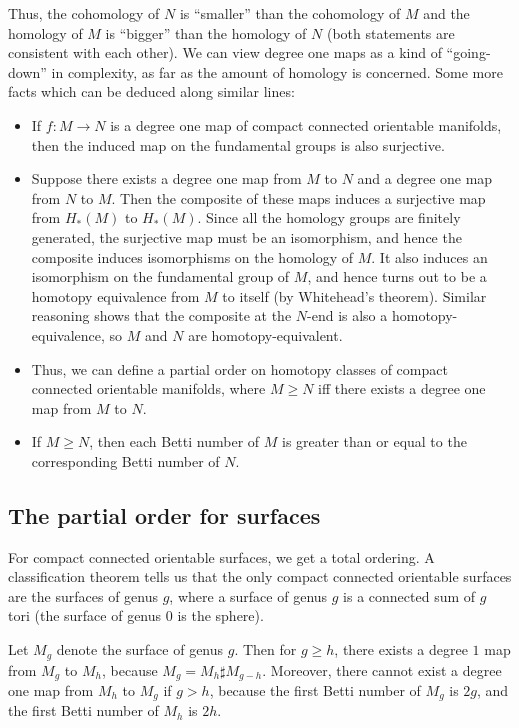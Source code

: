 \documentclass[a4paper]{amsart}
\begin{document}
Thus, the cohomology of $N$ is ``smaller'' than the cohomology of $M$
and the homology of $M$ is ``bigger'' than the homology of $N$ (both
statements are consistent with each other). We can view degree one
maps as a kind of ``going-down'' in complexity, as far as the amount
of homology is concerned. Some more facts which can be deduced along
similar lines:

\begin{itemize}

\item If $f:M \to N$ is a degree one map of compact connected
  orientable manifolds, then the induced map on the fundamental groups
  is also surjective.

\item Suppose there exists a degree one map from $M$ to $N$ and a
  degree one map from $N$ to $M$. Then the composite of these maps
  induces a surjective map from $H_*(M)$ to $H_*(M)$. Since all the
  homology groups are finitely generated, the surjective map must be
  an isomorphism, and hence the composite induces isomorphisms on the
  homology of $M$. It also induces an isomorphism on the fundamental
  group of $M$, and hence turns out to be a homotopy equivalence from
  $M$ to itself (by Whitehead's theorem). Similar reasoning shows that
  the composite at the $N$-end is also a homotopy-equivalence, so $M$
  and $N$ are homotopy-equivalent.

\item Thus, we can define a partial order on homotopy classes of
  compact connected orientable manifolds, where $M \ge N$ iff there
  exists a degree one map from $M$ to $N$.

\item If $M \ge N$, then each Betti number of $M$ is greater than or
  equal to the corresponding Betti number of $N$.
\end{itemize}

\subsection{The partial order for surfaces}

For compact connected orientable surfaces, we get a total ordering. A
classification theorem tells us that the only compact connected
orientable surfaces are the surfaces of genus $g$, where a surface of
genus $g$ is a connected sum of $g$ tori (the surface of genus $0$ is
the sphere).

Let $M_g$ denote the surface of genus $g$. Then for $g \ge h$, there
exists a degree $1$ map from $M_g$ to $M_h$, because $M_g = M_h \sharp
M_{g-h}$. Moreover, there cannot exist a degree one map from $M_h$ to
$M_g$ if $g > h$, because the first Betti number of $M_g$ is $2g$, and
the first Betti number of $M_h$ is $2h$.
\end{document}
